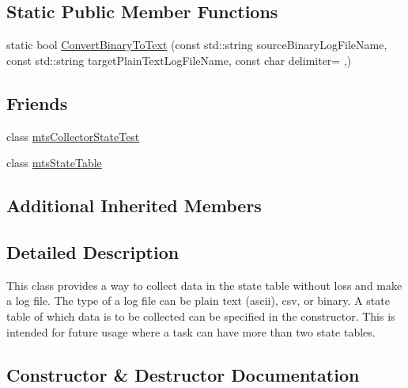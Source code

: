 \subsection*{Static Public Member Functions}
\begin{DoxyCompactItemize}
\item 
static bool \hyperlink{classmts_collector_state_ade0730c3367348b548d8cf56384269e7}{Convert\+Binary\+To\+Text} (const std\+::string source\+Binary\+Log\+File\+Name, const std\+::string target\+Plain\+Text\+Log\+File\+Name, const char delimiter= \textquotesingle{},\textquotesingle{})
\end{DoxyCompactItemize}
\subsection*{Friends}
\begin{DoxyCompactItemize}
\item 
class \hyperlink{classmts_collector_state_a9e2828100f64238c027a54e6a38b8307}{mts\+Collector\+State\+Test}
\item 
class \hyperlink{classmts_collector_state_af4d045a97beae5ceb1642100f69e82c9}{mts\+State\+Table}
\end{DoxyCompactItemize}
\subsection*{Additional Inherited Members}


\subsection{Detailed Description}
This class provides a way to collect data in the state table without loss and make a log file. The type of a log file can be plain text (ascii), csv, or binary. A state table of which data is to be collected can be specified in the constructor. This is intended for future usage where a task can have more than two state tables. 

\subsection{Constructor \& Destructor Documentation}
\hypertarget{classmts_collector_state_a34e1c33ed253cea0354e789c821ce68f}{}
